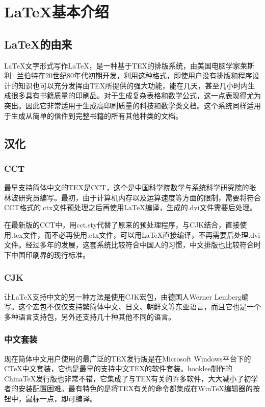 
\chapter{\LaTeX 基本介绍}
\section{\LaTeX 的由来}
\LaTeX 文字形式写作LaTeX，是一种基于TEX的排版系统，由美国电脑学家莱斯利·兰伯特在20世纪80年代初期开发，利用这种格式，即使用户没有排版和程序设计的知识也可以充分发挥由TEX所提供的强大功能，能在几天，甚至几小时内生成很多具有书籍质量的印刷品。对于生成复杂表格和数学公式，这一点表现得尤为突出。因此它非常适用于生成高印刷质量的科技和数学类文档。这个系统同样适用于生成从简单的信件到完整书籍的所有其他种类的文档。
\section{汉化}
\subsection{CCT}
最早支持简体中文的TEX是CCT，这个是中国科学院数学与系统科学研究院的张林波研究员编写。最初，由于计算机内存以及运算速度等方面的限制，需要将符合CCT格式的.ctx文件预处理之后再使用LaTeX编译，生成的.dvi文件需要后处理。 \par
在最新版的CCT中，用cct.sty代替了原来的预处理程序，与CJK结合，直接使用.tex文件，而不必再使用.ctx文件，可以用LaTeX直接编译，不再需要后处理.dvi文件。经过多年的发展，这套系统比较符合中国人的习惯，中文排版也比较符合时下中国印刷界的现行标准。
\subsection{CJK}
让\LaTeX 支持中文的另一种方法是使用CJK宏包，由德国人Werner Lemberg编写。这个宏包不仅仅支持繁简体中文、日文、朝鲜文等东亚语言，而且它也是一个多种语言支持包，另外还支持几十种其他不同的语言。
\subsection{中文套装}
现在简体中文用户使用的最广泛的TEX发行版是在Microsoft Windows平台下的CTeX中文套装，它也是最早的支持中文TEX的软件套装。hooklee制作的ChinaTeX发行版也非常不错，它集成了与TEX有关的许多软件，大大减小了初学者的安装配置困难。最有特色的是将TEX有关的命令都集成在WinTeX编辑器的按钮中，鼠标一点，即可编译。

